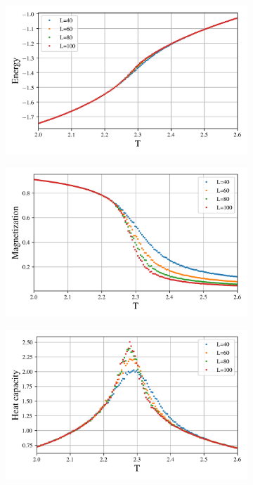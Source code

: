 \begin{figure}[ht]
  \begin{subfigure}[t]{.5\textwidth} %
    \centering
    \includegraphics[width=\linewidth]{../figures/phase_E.png}
    \caption{}
    \label{fig:sub-first}
  \end{subfigure}
  \hfill
  \begin{subfigure}[t]{.5\textwidth}
    \centering
    \includegraphics[width=\linewidth]{../figures/phase_Mabs.png}
    \caption{}
    \label{fig:sub-second}
  \end{subfigure}
  \hfill
  \newline
  \begin{subfigure}[t]{.5\textwidth}
    \centering
    \includegraphics[width=\linewidth]{../figures/phase_cv.png}

\end{subfigure}
\end{figure}
